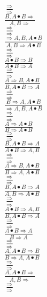 \documentclass[11pt]{article}
\begin{document}
\begin{center}
\bigskip
\\$\frac{\Rightarrow }{\Rightarrow }$
\bigskip
\\$\frac{B, A\bullet B\Rightarrow }{A, B\Rightarrow }$
\bigskip
\\$\frac{\Rightarrow }{\Rightarrow }$
\bigskip
\\$\frac{\Rightarrow A, B, A\bullet B}{A, B\Rightarrow A\bullet B}$
\bigskip
\\$\frac{\Rightarrow }{\Rightarrow }$
\bigskip
\\$\frac{A\bullet B\Rightarrow B}{A\bullet B\Rightarrow A}$
\bigskip
\\$\frac{\Rightarrow }{\Rightarrow }$
\bigskip
\\$\frac{A\Rightarrow B, A\bullet B}{B, A\bullet B\Rightarrow A}$
\bigskip
\\$\frac{\Rightarrow }{\Rightarrow }$
\bigskip
\\$\frac{B\Rightarrow A, A\bullet B}{\Rightarrow A, B, A\bullet B}$
\bigskip
\\$\frac{\Rightarrow }{\Rightarrow }$
\bigskip
\\$\frac{A\Rightarrow A\bullet B}{B\Rightarrow A\bullet B}$
\bigskip
\\$\frac{\Rightarrow }{\Rightarrow }$
\bigskip
\\$\frac{B, A\bullet B\Rightarrow A}{A\bullet B\Rightarrow A, B}$
\bigskip
\\$\frac{\Rightarrow }{\Rightarrow }$
\bigskip
\\$\frac{A\Rightarrow B, A\bullet B}{B\Rightarrow A, A\bullet B}$
\bigskip
\\$\frac{\Rightarrow }{\Rightarrow }$
\bigskip
\\$\frac{B, A\bullet B\Rightarrow A}{A, B\Rightarrow A\bullet B}$
\bigskip
\\$\frac{\Rightarrow }{\Rightarrow }$
\bigskip
\\$\frac{A\bullet B\Rightarrow A, B}{B, A\bullet B\Rightarrow A}$
\bigskip
\\$\frac{\Rightarrow }{\Rightarrow }$
\bigskip
\\$\frac{A\bullet B\Rightarrow A}{B\Rightarrow A}$
\bigskip
\\$\frac{\Rightarrow }{\Rightarrow }$
\bigskip
\\$\frac{A, A\bullet B\Rightarrow B}{B\Rightarrow A, A\bullet B}$
\bigskip
\\$\frac{\Rightarrow }{\Rightarrow }$
\bigskip
\\$\frac{A, A\bullet B\Rightarrow }{A, B\Rightarrow }$
\bigskip
\\$\frac{\Rightarrow }{\Rightarrow }$

\end{center}
\end{document}
